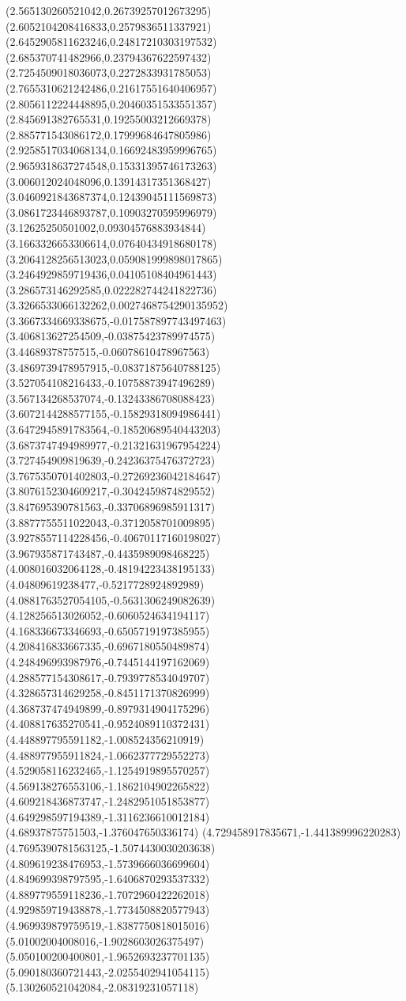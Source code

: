 {(2.565130260521042,0.26739257012673295)
(2.6052104208416833,0.2579836511337921)
(2.6452905811623246,0.24817210303197532)
(2.685370741482966,0.23794367622597432)
(2.7254509018036073,0.2272833931785053)
(2.7655310621242486,0.21617551640406957)
(2.8056112224448895,0.20460351533551357)
(2.845691382765531,0.19255003212669378)
(2.885771543086172,0.17999684647805986)
(2.9258517034068134,0.16692483959996765)
(2.9659318637274548,0.15331395746173263)
(3.006012024048096,0.13914317351368427)
(3.0460921843687374,0.12439045111569873)
(3.0861723446893787,0.10903270595996979)
(3.12625250501002,0.09304576883934844)
(3.1663326653306614,0.07640434918680178)
(3.2064128256513023,0.059081999898017865)
(3.2464929859719436,0.04105108404961443)
(3.286573146292585,0.022282744241822736)
(3.3266533066132262,0.0027468754290135952)
(3.3667334669338675,-0.017587897743497463)
(3.406813627254509,-0.03875423789974575)
(3.44689378757515,-0.06078610478967563)
(3.4869739478957915,-0.08371875640788125)
(3.527054108216433,-0.10758873947496289)
(3.567134268537074,-0.13243386708088423)
(3.6072144288577155,-0.15829318094986441)
(3.6472945891783564,-0.18520689540443203)
(3.6873747494989977,-0.21321631967954224)
(3.727454909819639,-0.24236375476372723)
(3.7675350701402803,-0.27269236042184647)
(3.8076152304609217,-0.3042459874829552)
(3.847695390781563,-0.33706896985911317)
(3.8877755511022043,-0.3712058701009895)
(3.9278557114228456,-0.40670117160198027)
(3.967935871743487,-0.4435989098468225)
(4.008016032064128,-0.48194223438195133)
(4.04809619238477,-0.5217728924892989)
(4.0881763527054105,-0.5631306249082639)
(4.128256513026052,-0.6060524634194117)
(4.168336673346693,-0.6505719197385955)
(4.208416833667335,-0.6967180550489874)
(4.248496993987976,-0.7445144197162069)
(4.288577154308617,-0.7939778534049707)
(4.328657314629258,-0.8451171370826999)
(4.368737474949899,-0.8979314904175296)
(4.408817635270541,-0.9524089110372431)
(4.448897795591182,-1.008524356210919)
(4.488977955911824,-1.0662377729552273)
(4.529058116232465,-1.1254919895570257)
(4.569138276553106,-1.1862104902265822)
(4.609218436873747,-1.2482951051853877)
(4.649298597194389,-1.3116236610012184)
(4.68937875751503,-1.376047650336174)
(4.729458917835671,-1.441389996220283)
(4.7695390781563125,-1.5074430030203638)
(4.809619238476953,-1.5739666036699604)
(4.849699398797595,-1.6406870293537332)
(4.889779559118236,-1.7072960422262018)
(4.929859719438878,-1.7734508820577943)
(4.969939879759519,-1.8387750818015016)
(5.01002004008016,-1.9028603026375497)
(5.050100200400801,-1.9652693237701135)
(5.090180360721443,-2.0255402941054115)
(5.130260521042084,-2.08319231057118)
}
